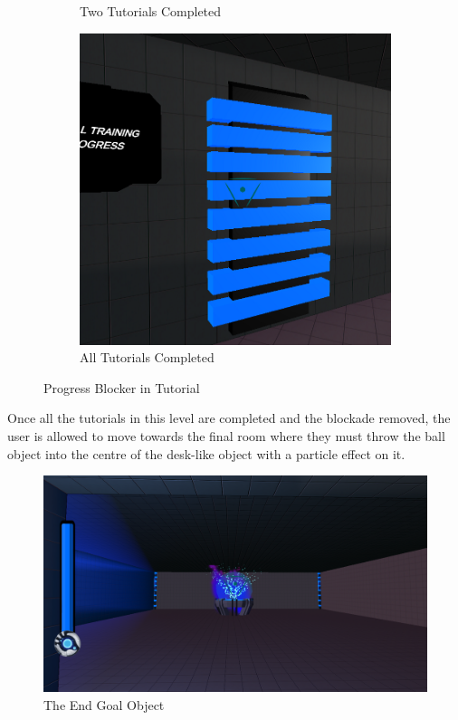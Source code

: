 \begin{figure}[H]
\begin{subfigure}{0.3\textwidth}
  \caption{Two Tutorials Completed}
\end{subfigure}
\begin{subfigure}{0.3\textwidth}
  \centering
  \includegraphics[width=0.9\linewidth]{Figures/barrier0.png}
  \caption{All Tutorials Completed}
\end{subfigure}
\caption{Progress Blocker in Tutorial}
\end{figure}

\noindent Once all the tutorials in this level are completed and the blockade removed, the user is allowed to move towards the final room where they must throw the ball object into the centre of the desk-like object with a particle effect on it.

\begin{figure}[H]
\centering
\centerline{\includegraphics[scale=0.33]{Figures/endgoal.png}}
\caption{The End Goal Object}
\end{figure}

